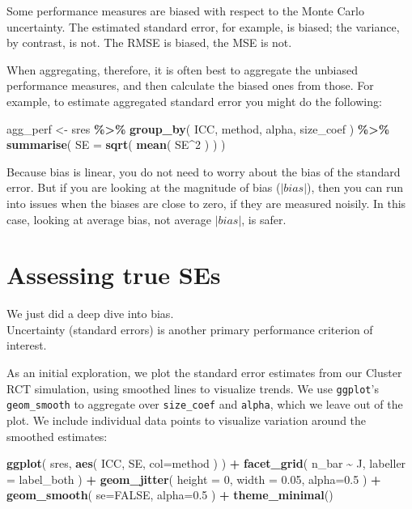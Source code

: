 \documentclass[
]{book}
\newenvironment{Shaded}{\begin{snugshade}}{\end{snugshade}}
\newcommand{\AttributeTok}[1]{\textcolor[rgb]{0.13,0.29,0.53}{#1}}
\newcommand{\ConstantTok}[1]{\textcolor[rgb]{0.56,0.35,0.01}{#1}}
\newcommand{\DecValTok}[1]{\textcolor[rgb]{0.00,0.00,0.81}{#1}}
\newcommand{\FloatTok}[1]{\textcolor[rgb]{0.00,0.00,0.81}{#1}}
\newcommand{\FunctionTok}[1]{\textcolor[rgb]{0.13,0.29,0.53}{\textbf{#1}}}
\newcommand{\NormalTok}[1]{#1}
\newcommand{\OtherTok}[1]{\textcolor[rgb]{0.56,0.35,0.01}{#1}}
\newcommand{\SpecialCharTok}[1]{\textcolor[rgb]{0.81,0.36,0.00}{\textbf{#1}}}
\begin{document}
Some performance measures are biased with respect to the Monte Carlo uncertainty.
The estimated standard error, for example, is biased; the variance, by contrast, is not.
The RMSE is biased, the MSE is not.

When aggregating, therefore, it is often best to aggregate the unbiased performance measures, and then calculate the biased ones from those.
For example, to estimate aggregated standard error you might do the following:

\begin{Shaded}
\begin{Highlighting}[]
\NormalTok{agg\_perf }\OtherTok{\textless{}{-}}\NormalTok{ sres }\SpecialCharTok{\%\textgreater{}\%} 
  \FunctionTok{group\_by}\NormalTok{( ICC, method, alpha, size\_coef ) }\SpecialCharTok{\%\textgreater{}\%}
  \FunctionTok{summarise}\NormalTok{( }\AttributeTok{SE =} \FunctionTok{sqrt}\NormalTok{( }\FunctionTok{mean}\NormalTok{( SE}\SpecialCharTok{\^{}}\DecValTok{2}\NormalTok{ ) ) )}
\end{Highlighting}
\end{Shaded}

Because bias is linear, you do not need to worry about the bias of the standard error.
But if you are looking at the magnitude of bias (\(|bias|\)), then you can run into issues when the biases are close to zero, if they are measured noisily.
In this case, looking at average bias, not average \(|bias|\), is safer.

\section{Assessing true SEs}\label{assessing-true-ses}

We just did a deep dive into bias.\\
Uncertainty (standard errors) is another primary performance criterion of interest.

As an initial exploration, we plot the standard error estimates from our Cluster RCT simulation, using smoothed lines to visualize trends. We use \texttt{ggplot}'s \texttt{geom\_smooth} to aggregate over \texttt{size\_coef} and \texttt{alpha}, which we leave out of the plot.
We include individual data points to visualize variation around the smoothed estimates:

\begin{Shaded}
\begin{Highlighting}[]
\FunctionTok{ggplot}\NormalTok{( sres, }\FunctionTok{aes}\NormalTok{( ICC, SE, }\AttributeTok{col=}\NormalTok{method ) ) }\SpecialCharTok{+}
  \FunctionTok{facet\_grid}\NormalTok{( n\_bar }\SpecialCharTok{\textasciitilde{}}\NormalTok{  J, }\AttributeTok{labeller =}\NormalTok{ label\_both ) }\SpecialCharTok{+}
  \FunctionTok{geom\_jitter}\NormalTok{( }\AttributeTok{height =} \DecValTok{0}\NormalTok{, }\AttributeTok{width =} \FloatTok{0.05}\NormalTok{, }\AttributeTok{alpha=}\FloatTok{0.5}\NormalTok{ ) }\SpecialCharTok{+}
  \FunctionTok{geom\_smooth}\NormalTok{( }\AttributeTok{se=}\ConstantTok{FALSE}\NormalTok{, }\AttributeTok{alpha=}\FloatTok{0.5}\NormalTok{ ) }\SpecialCharTok{+}
  \FunctionTok{theme\_minimal}\NormalTok{()}
\end{Highlighting}
\end{Shaded}
\end{document}
